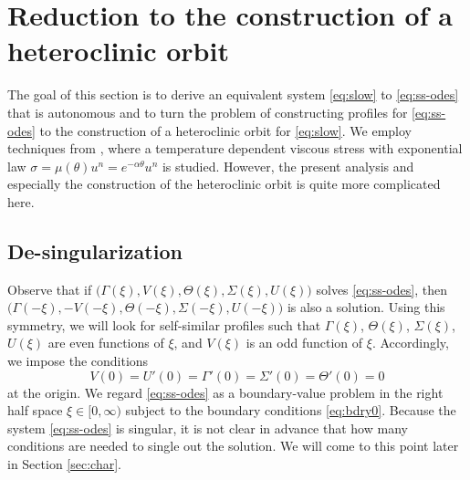 \documentclass[a4paper,11pt]{article}
\theoremstyle{remark}
\begin{document}
\vfil\eject

\section{Reduction to the construction of a heteroclinic orbit} \label{sec:formulation}
The goal of this section is to derive an equivalent system \eqref{eq:slow} to \eqref{eq:ss-odes} that is autonomous and to turn the problem of
constructing profiles for \eqref{eq:ss-odes} to the construction of a heteroclinic orbit for \eqref{eq:slow}. We employ techniques from \cite{KOT14}, where
a temperature dependent viscous stress with exponential law $ \sigma = \mu(\theta)u^n = e^{-\alpha\theta} u^n$ is studied. However, the present
analysis and especially the construction of the heteroclinic orbit is quite more complicated here.


\subsection{De-singularization}
Observe that if $\big(\Gamma(\xi), V(\xi), \Theta(\xi), \Sigma(\xi), U(\xi)\big)$ solves \eqref{eq:ss-odes}, then 
$\big(\Gamma(-\xi), -V(-\xi), \Theta(-\xi), \Sigma(-\xi), U(-\xi)\big)$ is also a solution. 
Using this symmetry, we will look for self-similar profiles such that $\Gamma(\xi)$, $\Theta(\xi)$, $\Sigma(\xi)$, $U(\xi)$ are even functions of $\xi$, and $V(\xi)$ is an odd function of $\xi$. Accordingly, we impose the conditions
\begin{equation}
 V(0)=U'(0)=\Gamma'(0)=\Sigma'(0)=\Theta'(0)=0 \label{eq:bdry0}
\end{equation}
at the origin. We regard \eqref{eq:ss-odes} as a boundary-value problem in the right half space $\xi \in [0,\infty)$ subject to the boundary conditions \eqref{eq:bdry0}. Because the system \eqref{eq:ss-odes} is singular, it is not clear in advance that how many conditions are needed to single out the solution. We will come to this point later in Section \ref{sec:char}.%
\end{document}
